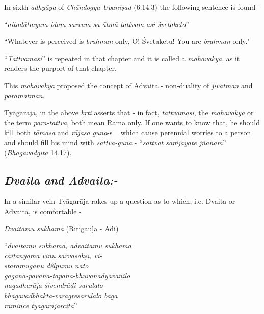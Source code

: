 In sixth \textit{adhyāya} of \textit{Chāndogya Upaniṣad} (6.14.3) the following sentence is found -

\begin{myquote}
\qquad\qquad“\textit{aitadātmyam idam sarvam sa ātmā tattvam asi śvetaketo}”
\end{myquote}

``Whatever is perceived is \textit{brahman} only, O! Śvetaketu! You are \textit{brahman} only."

“\textit{Tattvamasi}” is repeated in that chapter and it is called a \textit{mahāvākya}, as it renders the purport of that chapter.

This \textit{mahāvākya} proposed the concept of Advaita - non-duality of \textit{jīvātman} and \textit{paramātman}.

Tyāgarāja, in the above \textit{kṛti} asserts that - in fact, \textit{tattvamasi}, the \textit{mahāvākya} or the term \textit{para-tattva}, both mean Rāma only. If one wants to know that, he should kill both \textit{tāmasa} and \textit{rājasa} \textit{guṇa}-s   which cause perennial worries to a person and should fill his mind with \textit{sattva-guṇa} - “\textit{sattvāt saṁjāyate jñānam}” (\textit{Bhagavadgītā} 14.17).


\subsection*{\textit{Dvaita and Advaita:-}}

In a similar vein Tyāgarāja rakes up a question as to which, i.e. Dvaita or Advaita, is comfortable - 

\textit{Dvaitamu sukhamā} (Rītigauḷa - Ādi)

\begin{centerquote}
“\textit{dvaitamu sukhamā, advaitamu sukhamā}\\ \textit{caitanyamā vinu sarvasākṣī, vi-}\\ \textit{stāramugānu dêlpumu nāto}\\ \textit{gagana-pavana-tapana-bhuvanādyavanilo}\\ \textit{nagadharāja-śivendrādi-surulalo}\\ \textit{bhagavadbhakta-varāgresarulalo bāga}\\ \textit{ramince tyāgarājārcita}”
\end{centerquote}

